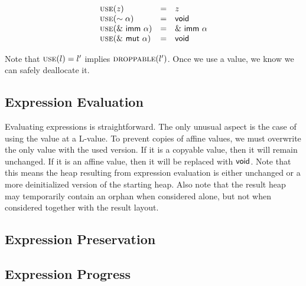 
\[
\begin{array}{lcl}
\textsc{use}(z) &=& z \\
\textsc{use}(\sim{\alpha}) &=& \mathsf{void} \\
\textsc{use}(\&~{{\mathsf{imm}}~{\alpha}}) &=& \&~{{\mathsf{imm}}~{\alpha}} \\
\textsc{use}(\&~{{\mathsf{mut}}~{\alpha}}) &=& \mathsf{void}
\end{array}
\]

Note that $\textsc{use}(l) = l'$ implies $\textsc{droppable}(l')$.
Once we use a value, we know we can safely deallocate it.

\subsection*{Expression Evaluation}
Evaluating expressions is straightforward.
The only unusual aspect is the case of using the value at a L-value.
To prevent copies of affine values, we must overwrite the only value
with the used version. If it is a copyable value, then it will remain unchanged.
If it is an affine value, then it will be replaced with $\mathsf{void}$.
Note that this means the heap resulting from expression evaluation is either
unchanged or a more deinitialized version of the starting heap.
Also note that the result heap may temporarily contain an orphan when considered alone,
but not when considered together with the result layout.
\newline



\subsection*{Expression Preservation}

\subsection*{Expression Progress}
